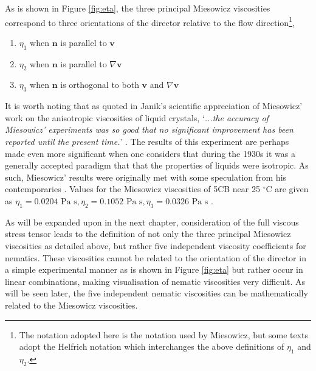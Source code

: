 As is shown in Figure \ref{fig:eta}, the three principal Miesowicz viscosities correspond to three orientations of the director relative to the flow direction\footnote{The notation adopted here is the notation used by Miesowicz, but some texts adopt the Helfrich notation \cite{Helfrich1969a} which interchanges the above definitions of $\eta_1$ and $\eta_2$.},

\begin{enumerate}
\item $\eta_1$ when $\bm{n}$ is parallel to $\bm{v}$
\item $\eta_2$ when $\bm{n}$ is parallel to $\nabla\bm{v}$
\item $\eta_3$ when $\bm{n}$ is orthogonal to both $\bm{v}$ and $\nabla\bm{v}$
\end{enumerate}

It is worth noting that as quoted in Janik's scientific appreciation of Miesowicz' work on the anisotropic viscosities of liquid crystals, `\textit{...the accuracy of Miesowicz' experiments was so good that no significant improvement has been reported until the present time.}' \cite{Janik1992}. The results of this experiment are perhaps made even more significant when one considers that during the 1930s it was a generally accepted paradigm that that the properties of liquids were isotropic. As such, Miesowicz' results were originally met with some speculation from his contemporaries \cite{Janik1992}.
Values for the Miesowicz viscosities of 5CB near 25 $^{\circ}$C are given as $\eta_1=0.0204 \text{ Pa s},\eta_2=0.1052 \text{ Pa s},\eta_3=0.0326 \text{ Pa s}$ \cite{Stewart2004}.

As will be expanded upon in the next chapter, consideration of the full viscous stress tensor leads to the definition of not only the three principal Miesowicz viscosities as detailed above, but rather five independent viscosity coefficients for nematics. These viscosities cannot be related to the orientation of the director in a simple experimental manner \cite{Stewart2004} as is shown in Figure \ref{fig:eta} but rather occur in linear combinations, making visualisation of nematic viscosities very difficult. As will be seen later, the five independent nematic viscosities can be mathematically related to the Miesowicz viscosities.
